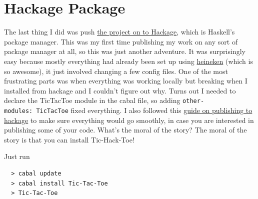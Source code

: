 \documentclass[12pt]{article}
\begin{document}
  \section{Hackage Package}\label{hackage-package}

  The last thing I did was push
  \href{https://hackage.haskell.org/package/Tic-Tac-Toe-0.1.0.2}{the
  project on to Hackage}, which is Haskell's package manager. This was my
  first time publishing my work on any sort of package manager at all, so
  this was just another adventure. It was surprisingly easy because mostly
  everything had already been set up using
  \href{https://github.com/khanage/heineken}{heineken} (which is so
  awesome), it just involved changing a few config files. One of the most
  frustrating parts was when everything was working locally but breaking
  when I installed from hackage and I couldn't figure out why. Turns out I
  needed to declare the TicTacToe module in the cabal file, so adding
  \texttt{other-modules:\ TicTacToe} fixed everything. I also followed
  this
  \href{http://begriffs.com/posts/2014-10-25-creating-package-hackage.html}{guide
  on publishing to hackage} to make sure everything would go smoothly, in
  case you are interested in publishing some of your code. What's the
  moral of the story? The moral of the story is that you can install
  Tic-Hack-Toe!

  Just run

  \begin{lstlisting}
  > cabal update 
  > cabal install Tic-Tac-Toe 
  > Tic-Tac-Toe
  \end{lstlisting}
\end{document}
